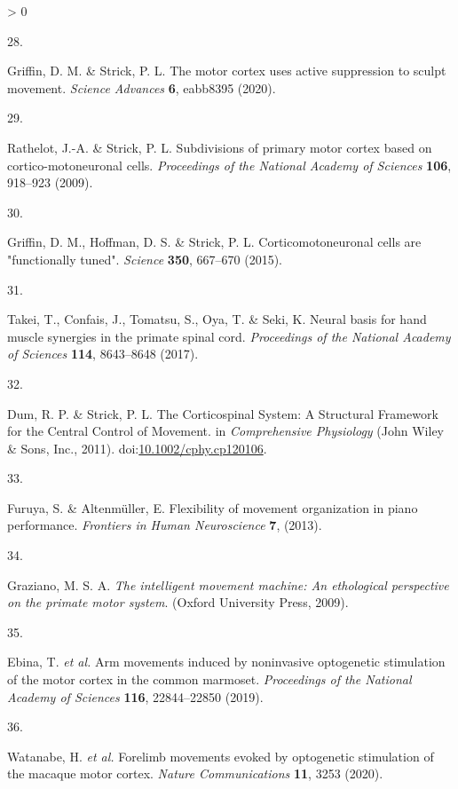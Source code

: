 \documentclass[
  a4paper,
]{article}
\newlength{\cslhangindent}
\newlength{\csllabelwidth}
\newenvironment{CSLReferences}[2] %
 {%
  \setlength{\parindent}{0pt}
  \ifodd #1 \everypar{\setlength{\hangindent}{\cslhangindent}}\ignorespaces\fi
  \ifnum #2 > 0
  \setlength{\parskip}{#2\baselineskip}
  \fi
 }%
 {}
\newcommand{\CSLLeftMargin}[1]{\parbox[t]{\csllabelwidth}{#1}}
\newcommand{\CSLRightInline}[1]{\parbox[t]{\linewidth - \csllabelwidth}{#1}\break}
\begin{document}
\begin{CSLReferences}{0}{0}
\leavevmode\hypertarget{ref-griffinMotorCortexUses2020}{}%
\CSLLeftMargin{28. }
\CSLRightInline{Griffin, D. M. \& Strick, P. L. The motor cortex uses
active suppression to sculpt movement. \emph{Science Advances}
\textbf{6}, eabb8395 (2020).}

\leavevmode\hypertarget{ref-Rathelot2009}{}%
\CSLLeftMargin{29. }
\CSLRightInline{Rathelot, J.-A. \& Strick, P. L. Subdivisions of primary
motor cortex based on cortico-motoneuronal cells. \emph{Proceedings of
the National Academy of Sciences} \textbf{106}, 918--923 (2009).}

\leavevmode\hypertarget{ref-griffinCorticomotoneuronalCellsAre2015}{}%
\CSLLeftMargin{30. }
\CSLRightInline{Griffin, D. M., Hoffman, D. S. \& Strick, P. L.
Corticomotoneuronal cells are "functionally tuned". \emph{Science}
\textbf{350}, 667--670 (2015).}

\leavevmode\hypertarget{ref-Takei2017}{}%
\CSLLeftMargin{31. }
\CSLRightInline{Takei, T., Confais, J., Tomatsu, S., Oya, T. \& Seki, K.
Neural basis for hand muscle synergies in the primate spinal cord.
\emph{Proceedings of the National Academy of Sciences} \textbf{114},
8643--8648 (2017).}

\leavevmode\hypertarget{ref-dumCorticospinalSystemStructural2011}{}%
\CSLLeftMargin{32. }
\CSLRightInline{Dum, R. P. \& Strick, P. L. The {Corticospinal System}:
{A Structural Framework} for the {Central Control} of {Movement}. in
\emph{Comprehensive {Physiology}} ({John Wiley \& Sons, Inc.}, 2011).
doi:\href{https://doi.org/10.1002/cphy.cp120106}{10.1002/cphy.cp120106}.}

\leavevmode\hypertarget{ref-furuyaFlexibilityMovementOrganization2013}{}%
\CSLLeftMargin{33. }
\CSLRightInline{Furuya, S. \& Altenmüller, E. Flexibility of movement
organization in piano performance. \emph{Frontiers in Human
Neuroscience} \textbf{7}, (2013).}

\leavevmode\hypertarget{ref-grazianoIntelligentMovementMachine2009}{}%
\CSLLeftMargin{34. }
\CSLRightInline{Graziano, M. S. A. \emph{The intelligent movement
machine: An ethological perspective on the primate motor system}.
({Oxford University Press}, 2009).}

\leavevmode\hypertarget{ref-ebina2019}{}%
\CSLLeftMargin{35. }
\CSLRightInline{Ebina, T. \emph{et al.} Arm movements induced by
noninvasive optogenetic stimulation of the motor cortex in the common
marmoset. \emph{Proceedings of the National Academy of Sciences}
\textbf{116}, 22844--22850 (2019).}

\leavevmode\hypertarget{ref-watanabeForelimbMovementsEvoked2020}{}%
\CSLLeftMargin{36. }
\CSLRightInline{Watanabe, H. \emph{et al.} Forelimb movements evoked by
optogenetic stimulation of the macaque motor cortex. \emph{Nature
Communications} \textbf{11}, 3253 (2020).}


\end{CSLReferences}
\end{document}
